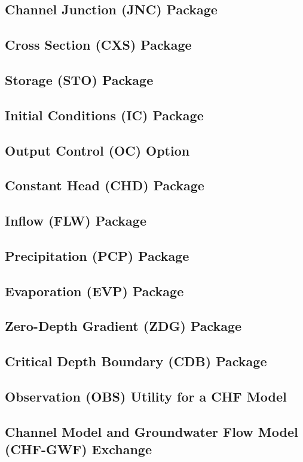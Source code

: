 \newpage
\subsection{Channel Junction (JNC) Package}


\newpage
\subsection{Cross Section (CXS) Package}


\newpage
\subsection{Storage (STO) Package}


\newpage
\subsection{Initial Conditions (IC) Package}


\newpage
\subsection{Output Control (OC) Option}


\newpage
\subsection{Constant Head (CHD) Package}


\newpage
\subsection{Inflow (FLW) Package}


\newpage
\subsection{Precipitation (PCP) Package}


\newpage
\subsection{Evaporation (EVP) Package}


\newpage
\subsection{Zero-Depth Gradient (ZDG) Package}


\newpage
\subsection{Critical Depth Boundary (CDB) Package}


\newpage
\subsection{Observation (OBS) Utility for a CHF Model}


\newpage
\subsection{Channel Model and Groundwater Flow Model (CHF-GWF) Exchange}


